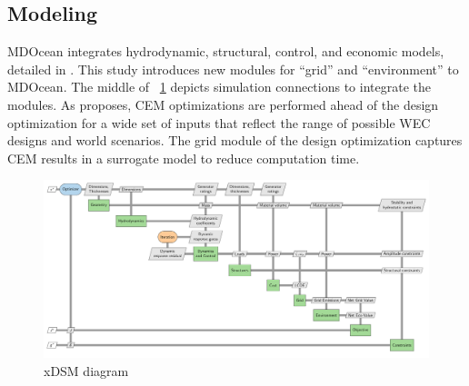 \documentclass[10pt,twoside]{article}
\begin{document}
\subsection{Modeling}
MDOcean integrates hydrodynamic, structural, control, and economic models, detailed in \cite{mccabe_leveraging_2025}.
This study introduces new modules for ``grid'' and ``environment'' to MDOcean. The middle of \figureautorefname~\ref{fig:n2} depicts simulation connections to integrate the modules.
As \cite{mccabe_system_2023} proposes, CEM optimizations are performed ahead of the design optimization for a wide set of inputs that reflect the range of possible WEC designs and world scenarios. The grid module of the design optimization captures CEM results in a surrogate model to reduce computation time.
\begin{figure}
    \centering
    \includegraphics[width=.74\textwidth]{figures/out/xdsm_grid.pdf}
    \caption{xDSM diagram}
    \label{fig:n2}
\end{figure}


\end{document}

